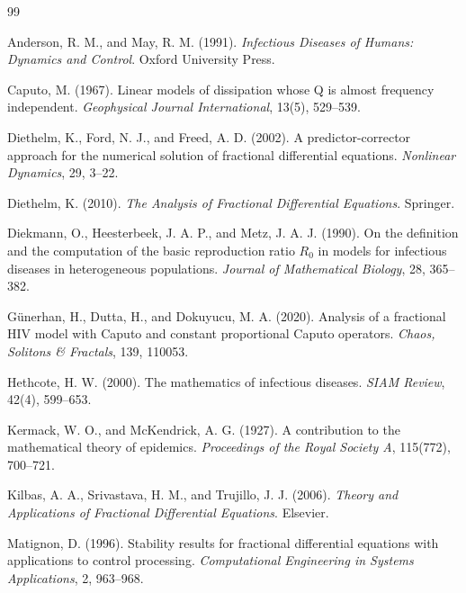 \documentclass[12pt,a4paper,oneside]{report}
\begin{document}
\begin{thebibliography}{99}

Anderson, R. M., and May, R. M. (1991).
\textit{Infectious Diseases of Humans: Dynamics and Control}.
Oxford University Press.

Caputo, M. (1967).
Linear models of dissipation whose Q is almost frequency independent.
\textit{Geophysical Journal International}, 13(5), 529--539.

Diethelm, K., Ford, N. J., and Freed, A. D. (2002).
A predictor-corrector approach for the numerical solution of fractional differential equations.
\textit{Nonlinear Dynamics}, 29, 3--22.

Diethelm, K. (2010).
\textit{The Analysis of Fractional Differential Equations}.
Springer.

Diekmann, O., Heesterbeek, J. A. P., and Metz, J. A. J. (1990).
On the definition and the computation of the basic reproduction ratio $R_0$ in models for infectious diseases in heterogeneous populations.
\textit{Journal of Mathematical Biology}, 28, 365--382.

Günerhan, H., Dutta, H., and Dokuyucu, M. A. (2020).
Analysis of a fractional HIV model with Caputo and constant proportional Caputo operators.
\textit{Chaos, Solitons \& Fractals}, 139, 110053.

Hethcote, H. W. (2000).
The mathematics of infectious diseases.
\textit{SIAM Review}, 42(4), 599--653.

Kermack, W. O., and McKendrick, A. G. (1927).
A contribution to the mathematical theory of epidemics.
\textit{Proceedings of the Royal Society A}, 115(772), 700--721.

Kilbas, A. A., Srivastava, H. M., and Trujillo, J. J. (2006).
\textit{Theory and Applications of Fractional Differential Equations}.
Elsevier.

Matignon, D. (1996).
Stability results for fractional differential equations with applications to control processing.
\textit{Computational Engineering in Systems Applications}, 2, 963--968.


\end{thebibliography}
\end{document}
